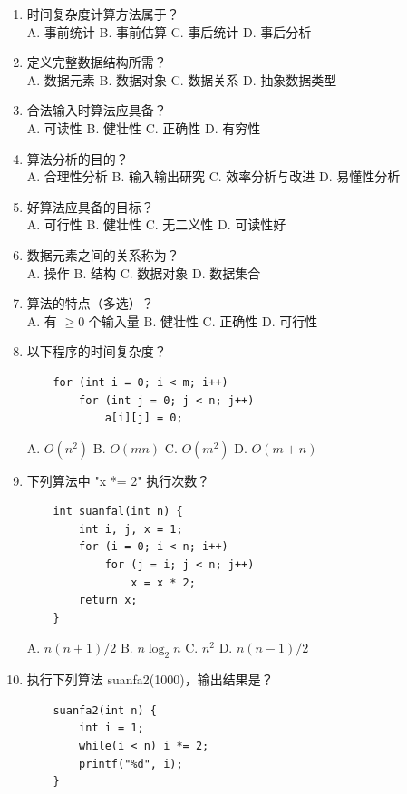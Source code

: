 \documentclass[lang=cn,newtx,10pt,scheme=chinese]{elegantbook}
\begin{document}
\begin{enumerate}
    \item 时间复杂度计算方法属于？\\
    A. 事前统计 \quad B. 事前估算 \quad C. 事后统计 \quad D. 事后分析

    \item 定义完整数据结构所需？\\
    A. 数据元素 \quad B. 数据对象 \quad C. 数据关系 \quad D. 抽象数据类型

    \item 合法输入时算法应具备？\\
    A. 可读性 \quad B. 健壮性 \quad C. 正确性 \quad D. 有穷性

    \item 算法分析的目的？\\
    A. 合理性分析 \quad B. 输入输出研究 \quad C. 效率分析与改进 \quad D. 易懂性分析

    \item 好算法应具备的目标？\\
    A. 可行性 \quad B. 健壮性 \quad C. 无二义性 \quad D. 可读性好

    \item 数据元素之间的关系称为？\\
    A. 操作 \quad B. 结构 \quad C. 数据对象 \quad D. 数据集合

    \item 算法的特点（多选）？\\
    A. 有 $\geq 0$ 个输入量 \quad B. 健壮性 \quad C. 正确性 \quad D. 可行性

    \item 以下程序的时间复杂度？
    \begin{verbatim}
    for (int i = 0; i < m; i++)
        for (int j = 0; j < n; j++)
            a[i][j] = 0;
    \end{verbatim}
    A. $O(n^2)$ \quad B. $O(mn)$ \quad C. $O(m^2)$ \quad D. $O(m+n)$

    \item 下列算法中 "x *= 2" 执行次数？
    \begin{verbatim}
    int suanfal(int n) {
        int i, j, x = 1;
        for (i = 0; i < n; i++)
            for (j = i; j < n; j++)
                x = x * 2;
        return x;
    }
    \end{verbatim}
    A. $n(n+1)/2$ \quad B. $n\log_2 n$ \quad C. $n^2$ \quad D. $n(n-1)/2$

    \item 执行下列算法 suanfa2(1000)，输出结果是？
    \begin{verbatim}
    suanfa2(int n) {
        int i = 1;
        while(i < n) i *= 2;
        printf("%d", i);
    }
    \end{verbatim}
    

\end{enumerate}
\end{document}
